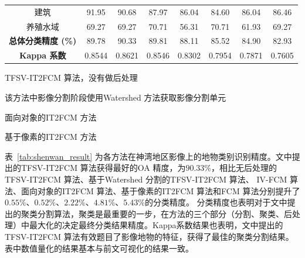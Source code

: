 \begin{table}[htbp]
{\begin{threeparttable}[b]
\begin{tabular}{cccccccc}
                建筑                       & 91.95                & 90.68             & 87.97                & 86.04  & 84.60           & 86.04           & 86.46  \\
                养殖水域                   & 69.27                & 69.27             & 70.71                & 56.31  & 70.71           & 61.93           & 69.27  \\
                \cline{1-8}
                \textbf{总体分类精度 (\%)} & 89.78                & 90.33             & 89.81                & 88.11  & 85.52           & 84.90           & 82.93  \\
                \textbf{Kappa 系数}        & 0.8544               & 0.8621            & 0.8546               & 0.8302 & 0.7954          & 0.7871          & 0.7605 \\
                \bottomrule
            \end{tabular}
            \begin{tablenotes}
                \item[1] {TFSV-IT2FCM 算法，没有做后处理}
                \item[2]{该方法中影像分割阶段使用Watershed 方法获取影像分割单元}
                \item[3]{面向对象的IT2FCM 方法}
                \item[4]{基于像素的IT2FCM 方法}
            \end{tablenotes}

        \end{threeparttable}
    }
\end{table}

表~\ref{tab:shenwan_result} 为各方法在神湾地区影像上的地物类别识别精度。文中提出的TFSV-IT2FCM 算法获得最好的OA 精度，为$90.33\%$，相比无后处理的TFSV-IT2FCM 算法、基于Watershed 分割的TFSV-IT2FCM 算法、 IV-FCM 算法、面向对象的IT2FCM 算法、基于像素的IT2FCM 算法和FCM 算法分别提升了$0.55\%$、$0.52\%$、$2.22\%$、$4.81\%$、$5.43\%$的分类精度。
分类精度也表明对于文中提出的聚类分割算法，聚类是最重要的一步，在方法的三个部分（分割、聚类、后处理）中最大化的决定最终分类结果精度。Kappa系数结果也表明，文中提出的TFSV-IT2FCM 算法有效题目了影像地物的特征，获得了最佳的聚类分割结果。表中数值量化的结果基本与前文可视化的结果一致。

